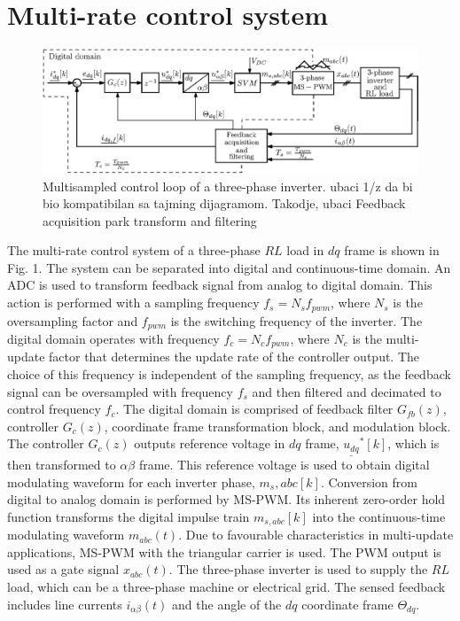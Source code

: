\documentclass[journal]{IEEEtran}
\begin{document}
\section{Multi-rate control system}

\begin{figure}[t!]
    \centerline{\includegraphics[width=0.95\linewidth]{figures/schematic.eps}}
    \caption{Multisampled control loop of a three-phase inverter. ubaci 1/z da bi bio kompatibilan sa tajming dijagramom. Takodje, ubaci Feedback acquisition park transform and filtering}
    \label{fig:MSControl}
\end{figure}

The multi-rate control system of a three-phase $RL$ load in $dq$ frame is shown in Fig. 1. The system can be separated into digital and continuous-time domain. An ADC is used to transform feedback signal from analog to digital domain. This action is performed with a sampling frequency $f_s = N_s f_{pwm}$, where $N_s$ is the oversampling factor and $f_{pwm}$ is the switching frequency of the inverter. The digital domain operates with frequency $f_c = N_c f_{pwm}$, where $N_c$ is the multi-update factor that determines the update rate of the controller output. The choice of this frequency is independent of the sampling frequency, as the feedback signal can be oversampled with frequency $f_s$ and then filtered and decimated to control frequency $f_c$. The digital domain is comprised of feedback filter $G_{fb}(z)$, controller $G_c(z)$, coordinate frame transformation block, and modulation block. The controller $G_c(z)$ outputs reference voltage in $dq$ frame, $\underline{u_{dq}}^*[k]$, which is then transformed to $\alpha \beta$ frame. This reference voltage is used to obtain digital modulating waveform for each inverter phase, $m_s,{abc}[k]$. Conversion from digital to analog domain is performed by MS-PWM. Its inherent zero-order hold function transforms the digital impulse train $m_{s,abc}[k]$ into the continuous-time modulating waveform $m_{abc}(t)$. Due to favourable characteristics in multi-update applications, MS-PWM with the triangular carrier is used. The PWM output is used as a gate signal $x_{abc}(t)$. The three-phase inverter is used to supply the $RL$ load, which can be a three-phase machine or electrical grid. The sensed feedback includes line currents $i_{\alpha \beta}(t)$ and the angle of the $dq$ coordinate frame $\Theta_{dq}$. 
\end{document}
